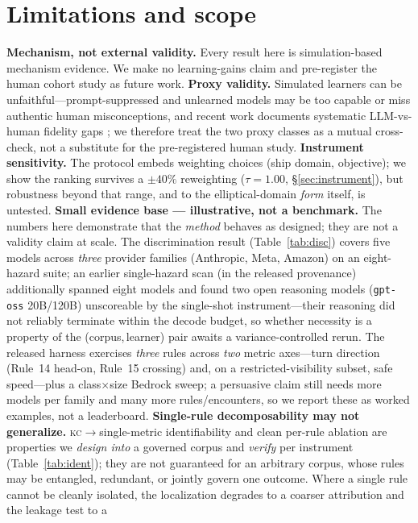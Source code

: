 \documentclass{article}
\newcommand{\kc}{\textsc{kc}}
\begin{document}
\section{Limitations and scope}
\label{sec:limits}
\textbf{Mechanism, not external validity.} Every result here is simulation-based mechanism
evidence. We make no learning-gains claim and pre-register the human cohort study as future
work. \textbf{Proxy validity.} Simulated learners can be unfaithful---prompt-suppressed and unlearned models
may be too capable or miss authentic human misconceptions, and recent work documents systematic
LLM-vs-human fidelity gaps \citep{validsim2026,studentfidelity2025,studentabilities2025}; we therefore
treat the two proxy classes as a mutual cross-check, not a substitute for the pre-registered human study. \textbf{Instrument sensitivity.} The protocol embeds weighting
choices (ship domain, objective); we show the ranking survives a $\pm40\%$ reweighting
($\tau=1.00$, \S\ref{sec:instrument}), but robustness beyond that range, and to the
elliptical-domain \emph{form} itself, is untested. \textbf{Small evidence base --- illustrative, not a benchmark.}
The numbers here demonstrate that the \emph{method} behaves as designed; they are not a
validity claim at scale. The discrimination result (Table~\ref{tab:disc}) covers five models across
\emph{three} provider families (Anthropic, Meta, Amazon) on an eight-hazard suite; an earlier
single-hazard scan (in the released provenance) additionally spanned eight models and found two open
reasoning models (\texttt{gpt-oss} 20B/120B) unscoreable by the single-shot instrument---their reasoning
did not reliably terminate within the decode budget, so whether necessity is a property of the
(corpus,\,learner) pair awaits a variance-controlled rerun. The released harness exercises \emph{three} rules across \emph{two} metric axes---turn direction (Rule~14
head-on, Rule~15 crossing) and, on a restricted-visibility subset, safe speed---plus a class$\times$size
Bedrock sweep; a persuasive claim still needs more models per family and many more rules/encounters, so we
report these as worked examples, not a leaderboard. \textbf{Single-rule decomposability may not generalize.}
\kc$\to$single-metric identifiability and clean per-rule ablation are properties we
\emph{design into} a governed corpus and \emph{verify} per instrument
(Table~\ref{tab:ident}); they are not guaranteed for an arbitrary corpus, whose rules may be
entangled, redundant, or jointly govern one outcome. Where a single rule cannot be cleanly
isolated, the localization degrades to a coarser attribution and the leakage test to a
\end{document}
